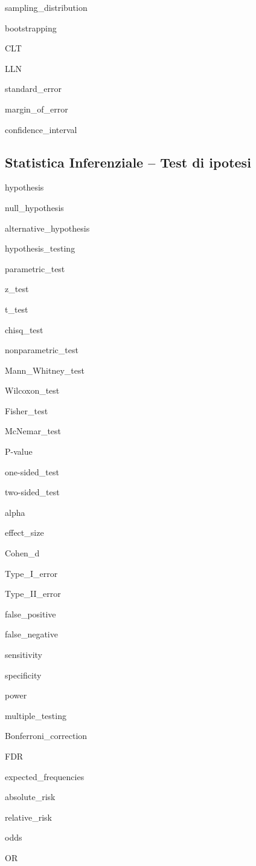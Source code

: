 \documentclass{report}
\begin{document}
\gls{sampling_distribution}

\gls{bootstrapping}

\gls{CLT}

\gls{LLN}

\gls{standard_error}

\gls{margin_of_error}

\gls{confidence_interval}




\subsection*{Statistica Inferenziale -- Test di ipotesi}

\gls{hypothesis}

\gls{null_hypothesis}

\gls{alternative_hypothesis}

\gls{hypothesis_testing}

\gls{parametric_test}

\gls{z_test}

\gls{t_test}

\gls{chisq_test}

\gls{nonparametric_test}

\gls{Mann_Whitney_test}

\gls{Wilcoxon_test}

\gls{Fisher_test}

\gls{McNemar_test}

\gls{P-value}

\gls{one-sided_test}

\gls{two-sided_test}

\gls{alpha}

\gls{effect_size}

\gls{Cohen_d}

\gls{Type_I_error}

\gls{Type_II_error}

\gls{false_positive}

\gls{false_negative}

\gls{sensitivity}

\gls{specificity}

\gls{power}

\gls{multiple_testing}

\gls{Bonferroni_correction}

\gls{FDR}

\gls{expected_frequencies}

\gls{absolute_risk}

\gls{relative_risk}

\gls{odds}

\gls{OR}
\end{document}

